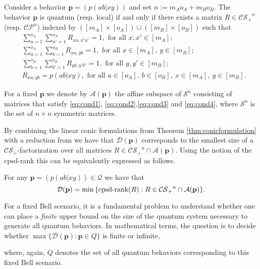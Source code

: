 \documentclass{siamart}
\begin{document}
{{\medskip 
\begin{theorem}[\cite{SV}]\label{thm:conicformulation}
 Consider a behavior    ${\mathbf{p}}={(p(ab|xy))}$ and set $n:=m_A o_A+m_B o_B$. The {behavior}   ${\mathbf{p}}$ is quantum (resp. local)  if and only if there exists  a matrix $R\in {\mathcal{CS}_+}^n$ (resp. {${\mathcal{CP}}^n$})  indexed by
{$([m_A] \times [o_A]) \cup ([m_B] \times [o_B])$}
 such that
\begin{align}
 & {\sum_{a = 1}^{o_A} \sum_{a' = 1}^{o_A}} R_{xa,x'a'}=1, \text{ for all } x,x' {\in [m_A]}; \label{eq:cond1}\\
 & {\sum_{a = 1}^{o_A} \sum_{b = 1}^{o_B}} R_{xa,yb}=1, \text{ for all } x {\in [m_A]}, \ y {\in [m_B]};\label{eq:cond2}\\
  & {\sum_{b=1}^{o_B} \sum_{b'=1}^{o_B}} R_{yb,y'b'}=1, \text{ for all } y,y' {\in [m_B]};\label{eq:cond3}\\
  & R_{xa,yb}=p(ab|xy), \text{ for all } {a \in [o_A], \ b \in [o_B], \ x \in [m_A], \ y \in [m_B]}. \label{eq:cond4}
\end{align}
\end{theorem}

For a fixed ${\mathbf{p}}$ we denote by $\mathcal{A}({\mathbf{p}}) $ the  affine
subspace of ${\mathcal{S}}^n$  {consisting} of matrices that satisfy
\eqref{eq:cond1}, \eqref{eq:cond2},\eqref{eq:cond3} and
\eqref{eq:cond4}, {where ${\mathcal{S}}^n$ is the set of $n\times n$
symmetric matrices}.

{By combining  the linear conic formulations from Theorem
\ref{thm:conicformulation} with {a} reduction from  \cite{SVW15}
we have that $\mathcal{D}({\mathbf{p}})$ corresponds to}  the smallest size
of a ${\mathcal{CS}_+}$-factorization over all matrices {$R\in {\mathcal{CS}_+}^n\cap
\mathcal{A}({\mathbf{p}})$}. Using the notion of the cpsd-rank this can be
equivalently expressed as follows.

\medskip 
\begin{theorem}\label{thm:minsizequantumcorrelation}
For any $ {\mathbf{p}}={(p(ab|xy))}\in {\mathcal{Q}}$ we have that
\[ {\mathcal{D}({\mathbf{p}}) = {\min} \left\{ {\mathrm{cpsd}\textnormal{-rank}}(R): {R\in {\mathcal{CS}_+}^n\cap \mathcal{A}({\mathbf{p}})}\right\}}. \]
\end{theorem}
\medskip

For a fixed Bell scenario,  it is a fundamental problem  to understand whether  one can place  a {\em finite} upper bound on the size of the quantum system necessary to generate all quantum behaviors. In mathematical terms,  the question is to decide  whether
$ \max\{ \mathcal{D}({\mathbf{p}}): {\mathbf{p}}\in Q\}$ is  finite or  infinite, {where, {again}, $Q$ denotes  the set of all quantum behaviors corresponding to  this fixed Bell scenario.

}}}
\end{document}
